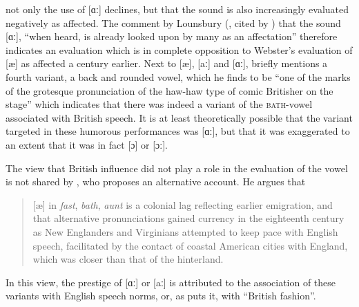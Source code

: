 not only the use of [ɑː] declines, but that the sound is also increasingly evaluated negatively as affected. The comment by Lounsbury (\citeyear[101]{Lounsbury1909}, cited by \citealt[76--77]{Krapp19252}) that the sound [ɑː], “when heard, is already looked upon by many as an affectation” therefore indicates an evaluation which is in complete opposition to Webster’s evaluation of [æ] as affected a century earlier. Next to [æ], [aː] and [ɑː], \citet[36]{Krapp19252} briefly mentions a fourth variant, a back and rounded vowel, which he finds to be “one of the marks of the grotesque pronunciation of the haw-haw type of comic Britisher on the stage” which indicates that there was indeed a variant of the \textsc{bath}{}-vowel associated with British speech. It is at least theoretically possible that the variant targeted in these humorous performances was [ɑː], but that it was exaggerated to an extent that it was in fact [ɔ] or [ɔː].

The view that British influence did not play a role in the evaluation of the vowel is not shared by \citet[141]{Montgomery2001}, who proposes an alternative account. He argues that

\begin{quote}
[æ] in \emph{fast}, \emph{bath}, \emph{aunt} is a colonial lag reflecting earlier emigration, and that alternative pronunciations gained currency in the eighteenth century as New Englanders and Virginians attempted to keep pace with English speech, facilitated by the contact of coastal American cities with England, which was closer than that of the hinterland.
\end{quote}


In this view, the prestige of [ɑː] or [aː] is attributed to the association of these variants with English speech norms, or, as \citet[140]{Montgomery2001} puts it, with “British fashion”.


